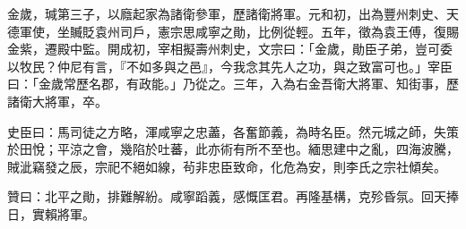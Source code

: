 \begin{pinyinscope}
 金歲，瑊第三子，以廕起家為諸衛參軍，歷諸衛將軍。元和初，出為豐州刺史、天德軍使，坐贓貶袁州司戶，憲宗思咸寧之勛，比例從輕。五年，徵為袁王傅，復賜金紫，遷殿中監。開成初，宰相擬壽州刺史，文宗曰：「金歲，勛臣子弟，豈可委以牧民？仲尼有言，『不如多與之邑』，今我念其先人之功，與之致富可也。」宰臣曰：「金歲常歷名郡，有政能。」乃從之。三年，入為右金吾衛大將軍、知街事，歷諸衛大將軍，卒。



 史臣曰：馬司徒之方略，渾咸寧之忠藎，各奮節義，為時名臣。然元城之師，失策於田悅；平涼之會，幾陷於吐蕃，此亦術有所不至也。緬思建中之亂，四海波騰，賊泚竊發之辰，宗祀不絕如線，茍非忠臣致命，化危為安，則李氏之宗社傾矣。



 贊曰：北平之勛，排難解紛。咸寧蹈義，感慨匡君。再隆基構，克殄昏氛。回天捧日，實賴將軍。



\end{pinyinscope}